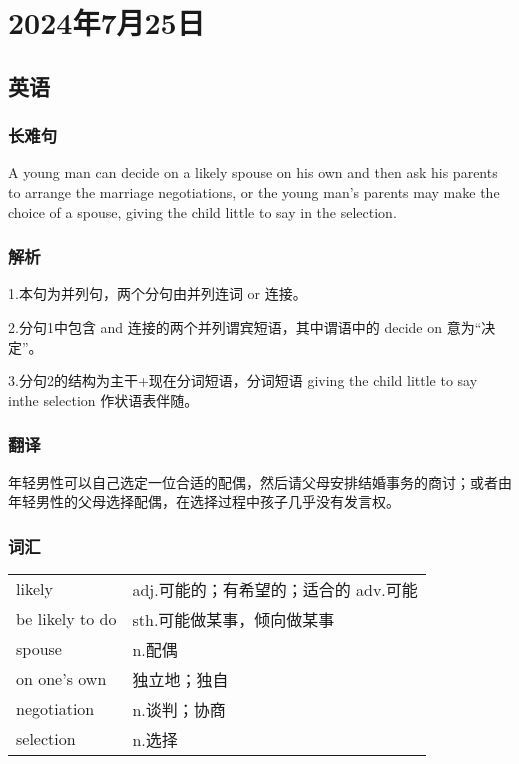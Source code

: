 \documentclass[UTF8]{ctexart}
\begin{document}
\section{2024年7月25日}
\subsection{英语}
\subsubsection{长难句}
A young man can decide on a likely spouse on his own and then ask his parents to arrange the marriage negotiations, or the young man's parents may make the choice of a spouse, giving the child little to say in the selection.
\subsubsection{解析}
1.本句为并列句，两个分句由并列连词 or 连接。

2.分句1中包含 and 连接的两个并列谓宾短语，其中谓语中的 decide on 意为“决定”。

3.分句2的结构为主干+现在分词短语，分词短语 giving the child little to say inthe selection 作状语表伴随。
\subsubsection{翻译}
年轻男性可以自己选定一位合适的配偶，然后请父母安排结婚事务的商讨；或者由年轻男性的父母选择配偶，在选择过程中孩子几乎没有发言权。
\subsubsection{词汇}
\begin{table}[h]
      \centering
      \begin{tabular}{p{}p{}}
            likely          & adj.可能的；有希望的；适合的 adv.可能 \\
            be likely to do & sth.可能做某事，倾向做某事         \\
            spouse          & n.配偶                    \\
            on one's own    & 独立地；独自                  \\
            negotiation     & n.谈判；协商                 \\
            selection       & n.选择                    \\
      \end{tabular}
\end{table}
\end{document}
